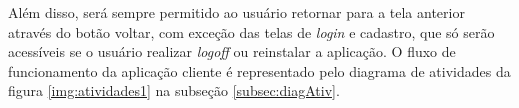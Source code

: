 \begin{figure}[!htb]
\label{fig:dag}
\end{figure}


Além disso, será sempre permitido ao usuário retornar para a tela anterior através do botão voltar, com exceção das telas de \textit{login} e cadastro, que só serão acessíveis se o usuário realizar \textit{logoff} ou reinstalar a aplicação. O fluxo de funcionamento da aplicação cliente é representado pelo diagrama de atividades da figura \ref{img:atividades1} na subseção \ref{subsec:diagAtiv}.

